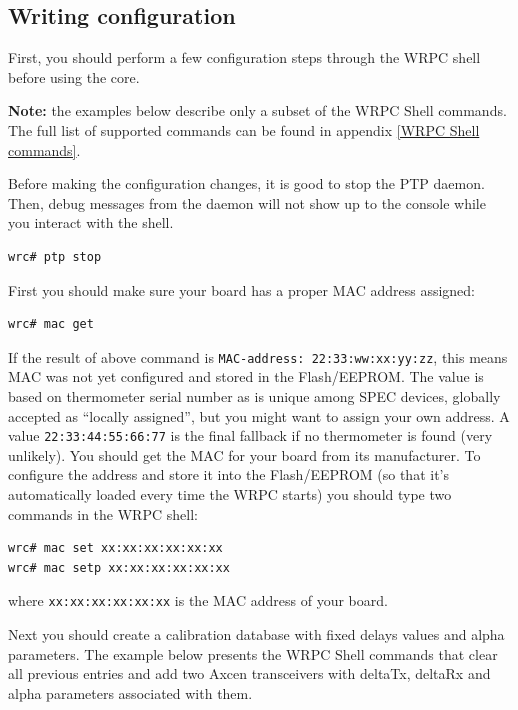 \documentclass[a4paper, 12pt]{article}
\newcommand{\codeHook}[1]{\mbox{\ttfamily\MakeTextUppercase{#1}}}
\begin{document}
\subsection{Writing configuration}
\label{Writing configuration}

First, you should perform a few configuration steps through the \codeHook{wrpc} shell
before using the core.

\noindent\textbf{Note:} the examples below describe only a subset of the \codeHook{wrpc} Shell
commands. The full list of supported commands can be found in appendix
\ref{WRPC Shell commands}.

\vspace{1em}
Before making the configuration changes, it is good to stop the \codeHook{ptp} daemon.
Then, debug messages from the daemon will not show up to the console while you
interact with the shell.

\begin{lstlisting}
wrc# ptp stop
\end{lstlisting}

\vspace{1em}
First you should make sure your board has a proper \codeHook{mac} address assigned:
\begin{lstlisting}
wrc# mac get
\end{lstlisting}
If the result of above command is \texttt{MAC-address: 22:33:ww:xx:yy:zz}, this means
\codeHook{mac} was not yet configured and stored in the Flash/EEPROM. The value is
based on thermometer serial number as is unique among SPEC devices,
globally accepted as ``locally assigned'', but you might want to assign your own address. A value \texttt{22:33:44:55:66:77} is the final fallback if no
thermometer is found (very unlikely). You should get
the \codeHook{mac} for your board from its manufacturer. To configure the address and
store it into the Flash/EEPROM (so that it's automatically loaded every time the
\codeHook{wrpc} starts) you should type two commands in the \codeHook{wrpc} shell:
\begin{lstlisting}
wrc# mac set xx:xx:xx:xx:xx:xx
wrc# mac setp xx:xx:xx:xx:xx:xx
\end{lstlisting}
where \texttt{xx:xx:xx:xx:xx:xx} is the \codeHook{mac} address of your board.

\vspace{1em}
Next you should create a calibration database with fixed delays values and
alpha parameters. The example below presents the \codeHook{wrpc} Shell commands that
clear all previous entries and add two Axcen transceivers with deltaTx, deltaRx
and alpha parameters associated with them.
\end{document}
